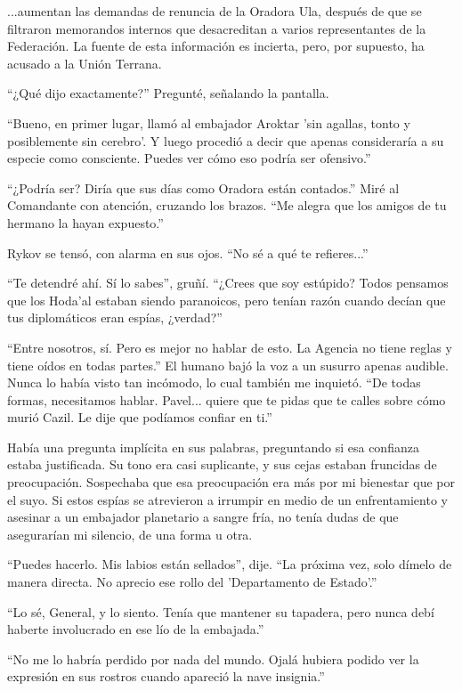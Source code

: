 \documentclass[spanish,12pt,a4paper,oneside,titlepage]{book}
\begin{document}
    ...aumentan las demandas de renuncia de la Oradora Ula, después de que se filtraron memorandos internos que desacreditan a varios representantes de la Federación. La fuente de esta información es incierta, pero, por supuesto, ha acusado a la Unión Terrana.

    ``¿Qué dijo exactamente?'' Pregunté, señalando la pantalla.

    ``Bueno, en primer lugar, llamó al embajador Aroktar 'sin agallas, tonto y posiblemente sin cerebro'. Y luego procedió a decir que apenas consideraría a su especie como consciente. Puedes ver cómo eso podría ser ofensivo.''

    ``¿Podría ser? Diría que sus días como Oradora están contados.'' Miré al Comandante con atención, cruzando los brazos. ``Me alegra que los amigos de tu hermano la hayan expuesto.''

    Rykov se tensó, con alarma en sus ojos. ``No sé a qué te refieres...''

    ``Te detendré ahí. Sí lo sabes'', gruñí. ``¿Crees que soy estúpido? Todos pensamos que los Hoda'al estaban siendo paranoicos, pero tenían razón cuando decían que tus diplomáticos eran espías, ¿verdad?''

    ``Entre nosotros, sí. Pero es mejor no hablar de esto. La Agencia no tiene reglas y tiene oídos en todas partes.'' El humano bajó la voz a un susurro apenas audible. Nunca lo había visto tan incómodo, lo cual también me inquietó. ``De todas formas, necesitamos hablar. Pavel... quiere que te pidas que te calles sobre cómo murió Cazil. Le dije que podíamos confiar en ti.''

    Había una pregunta implícita en sus palabras, preguntando si esa confianza estaba justificada. Su tono era casi suplicante, y sus cejas estaban fruncidas de preocupación. Sospechaba que esa preocupación era más por mi bienestar que por el suyo. Si estos espías se atrevieron a irrumpir en medio de un enfrentamiento y asesinar a un embajador planetario a sangre fría, no tenía dudas de que asegurarían mi silencio, de una forma u otra.

    ``Puedes hacerlo. Mis labios están sellados'', dije. ``La próxima vez, solo dímelo de manera directa. No aprecio ese rollo del 'Departamento de Estado'.''

    ``Lo sé, General, y lo siento. Tenía que mantener su tapadera, pero nunca debí haberte involucrado en ese lío de la embajada.''

    ``No me lo habría perdido por nada del mundo. Ojalá hubiera podido ver la expresión en sus rostros cuando apareció la nave insignia.''
\end{document}
